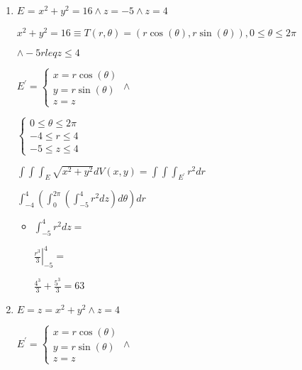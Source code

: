 \documentclass[../practica_09.tex]{subfiles}
\begin{document}
    \begin{enumerate}
        \item $E$ = $x^2+y^2 = 16 \wedge z = -5 \wedge z = 4$
        
            $ x^2+y^2 = 16 \equiv T(r, \theta) = (r\cos(\theta), r\sin(\theta)), 0 \leq \theta \leq 2\pi$

            $\wedge -5 rleq z \leq 4$

            $E^{\prime} = \left\{
                \begin{array}{ll}
                    x = r\cos(\theta)\\
                    y = r\sin(\theta)\\
                    z = z
                \end{array}
            \right. \wedge $

            $ \left\{
                \begin{array}{ll}
                    0 \leq \theta \leq 2\pi\\
                    -4 \leq r \leq 4\\
                    -5 \leq z \leq 4
                \end{array}
            \right. $

            $ \int\int\int_E \sqrt{x^2+y^2} dV(x,y) = \int\int\int_{E^{\prime}} r^2 dr $

            $\int_{-4}^4 (\int_0^{2\pi} (\int_{-5}^4 r^2 dz) d\theta) dr$

            \begin{itemize}
                \item $\int_{-5}^4 r^2 dz = $
                
                    $ \left. \frac{r^3}{3} \right |_{-5}^4 = $

                    $ \frac{4^3}{3} + \frac{5^3}{3} = 63 $

            \end{itemize}

        \item $E = z = x^2+y^2 \wedge z = 4$
        
            $E^{\prime} =  \left\{
                \begin{array}{ll}
                    x = r\cos(\theta)\\
                    y = r\sin(\theta)\\
                    z = z
                \end{array}
            \right. \wedge $


\end{enumerate}
\end{document}
